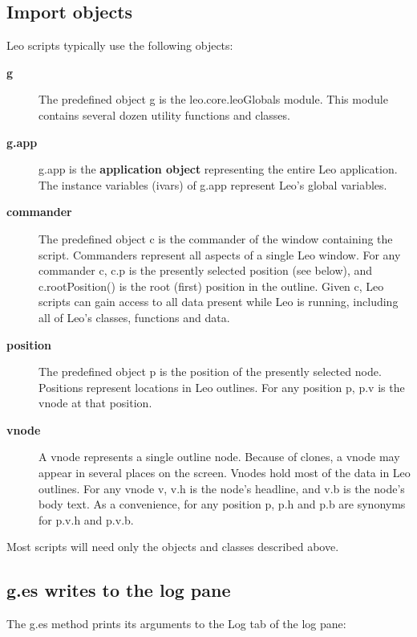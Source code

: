 \documentclass[a4paper,10pt,english]{sphinxmanual}
\begin{document}
\subsection{Import objects}
\label{scripting:import-objects}
Leo scripts typically use the following objects:
\begin{description}
\item[{\textbf{g}}] \leavevmode
The predefined object g is the leo.core.leoGlobals module. This module
contains several dozen utility functions and classes.

\item[{\textbf{g.app}}] \leavevmode
g.app is the \textbf{application object} representing the entire Leo application.
The instance variables (ivars) of g.app represent Leo's global variables.

\item[{\textbf{commander}}] \leavevmode
The predefined object c is the commander of the window containing the
script. Commanders represent all aspects of a single Leo window. For any
commander c, c.p is the presently selected position (see below), and
c.rootPosition() is the root (first) position in the outline. Given
c, Leo scripts can gain access to all data present while Leo is running,
including all of Leo's classes, functions and data.

\item[{\textbf{position}}] \leavevmode
The predefined object p is the position of the presently selected
node. Positions represent locations in Leo outlines. For any position p,
p.v is the vnode at that position.

\item[{\textbf{vnode}}] \leavevmode
A vnode represents a single outline node. Because of clones, a vnode may
appear in several places on the screen. Vnodes hold most of the data in Leo
outlines. For any vnode v, v.h is the node's headline, and v.b is the node's
body text. As a convenience, for any position p, p.h and p.b are synonyms
for p.v.h and p.v.b.

\end{description}

Most scripts will need only the objects and classes described above.


\subsection{g.es writes to the log pane}
\label{scripting:g-es-writes-to-the-log-pane}
The g.es method prints its arguments to the Log tab of the log pane:
\end{document}
